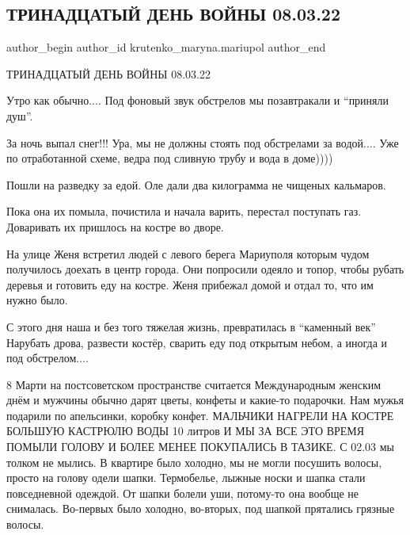  
 
 
 
 

\subsection{ТРИНАДЦАТЫЙ ДЕНЬ ВОЙНЫ 08.03.22}
\label{sec:08_03_2023.fb.krutenko_maryna.mariupol.1.13_den_08_03}

\ifcmt
 author_begin
   author_id krutenko_maryna.mariupol
 author_end
\fi

ТРИНАДЦАТЫЙ ДЕНЬ ВОЙНЫ 08.03.22

Утро как обычно.... Под фоновый звук обстрелов мы позавтракали и \enquote{приняли душ}. 

За ночь выпал снег!!! Ура, мы не должны стоять под обстрелами за водой.... Уже по
отработанной схеме, ведра под сливную трубу и вода в доме))))

Пошли на разведку за едой. Оле дали два килограмма не чищеных кальмаров. 

Пока она их помыла, почистила и начала варить, перестал поступать газ.
Доваривать их пришлось на костре во дворе. 

На улице Женя встретил людей с левого берега Мариуполя которым чудом получилось
доехать в центр города. Они попросили одеяло и топор, чтобы рубать деревья и
готовить еду на костре. Женя прибежал домой и отдал то, что им нужно было. 

С этого дня наша и без того тяжелая жизнь, превратилась в \enquote{каменный век}
Нарубать дрова, развести костёр, сварить еду под открытым небом, а иногда и под
обстрелом....

8 Марти на постсоветском пространстве считается Международным женским днём и
мужчины обычно дарят цветы, конфеты и какие-то подарочки. Нам мужья подарили по
апельсинки, коробку конфет. МАЛЬЧИКИ НАГРЕЛИ НА КОСТРЕ БОЛЬШУЮ КАСТРЮЛЮ ВОДЫ 10
литров И МЫ ЗА ВСЕ ЭТО ВРЕМЯ ПОМЫЛИ ГОЛОВУ И БОЛЕЕ МЕНЕЕ ПОКУПАЛИСЬ В ТАЗИКЕ.
С 02.03 мы толком не мылись. В квартире было холодно, мы не могли посушить
волосы, просто на голову одели шапки. Термобелье, лыжные носки и шапка стали
повседневной одеждой. От шапки болели уши, потому-то она вообще не снималась.
Во-первых было холодно, во-вторых, под шапкой прятались грязные волосы.

